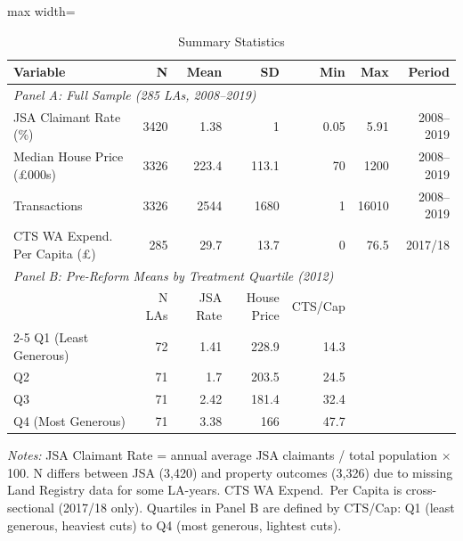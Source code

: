 \begin{table}[t]
\centering
\caption{Summary Statistics}
\label{tab:summary}
\begin{adjustbox}{max width=\textwidth}
\begin{tabular}{lrrrrrr}
\toprule
Variable & N & Mean & SD & Min & Max & Period \\
\midrule
\multicolumn{7}{l}{\textit{Panel A: Full Sample (285 LAs, 2008--2019)}} \\
JSA Claimant Rate (\%) & 3420 & 1.38 & 1 & 0.05 & 5.91 & 2008--2019 \\
Median House Price (\pounds 000s) & 3326 & 223.4 & 113.1 & 70 & 1200 & 2008--2019 \\
Transactions & 3326 & 2544 & 1680 & 1 & 16010 & 2008--2019 \\
CTS WA Expend. Per Capita (\pounds) & 285 & 29.7 & 13.7 & 0 & 76.5 & 2017/18 \\
\midrule
\multicolumn{7}{l}{\textit{Panel B: Pre-Reform Means by Treatment Quartile (2012)}} \\
 & N LAs & JSA Rate & House Price & CTS/Cap & & \\
\cmidrule{2-5}
Q1 (Least Generous) & 72 & 1.41 & 228.9 & 14.3 & & \\
Q2 & 71 & 1.7 & 203.5 & 24.5 & & \\
Q3 & 71 & 2.42 & 181.4 & 32.4 & & \\
Q4 (Most Generous) & 71 & 3.38 & 166 & 47.7 & & \\
\bottomrule
\end{tabular}
\end{adjustbox}
\begin{flushleft}
\footnotesize
\textit{Notes:} JSA Claimant Rate = annual average JSA claimants / total population $\times$ 100. N differs between JSA (3,420) and property outcomes (3,326) due to missing Land Registry data for some LA-years. CTS WA Expend.\ Per Capita is cross-sectional (2017/18 only). Quartiles in Panel B are defined by CTS/Cap: Q1 (least generous, heaviest cuts) to Q4 (most generous, lightest cuts).
\end{flushleft}
\end{table}
